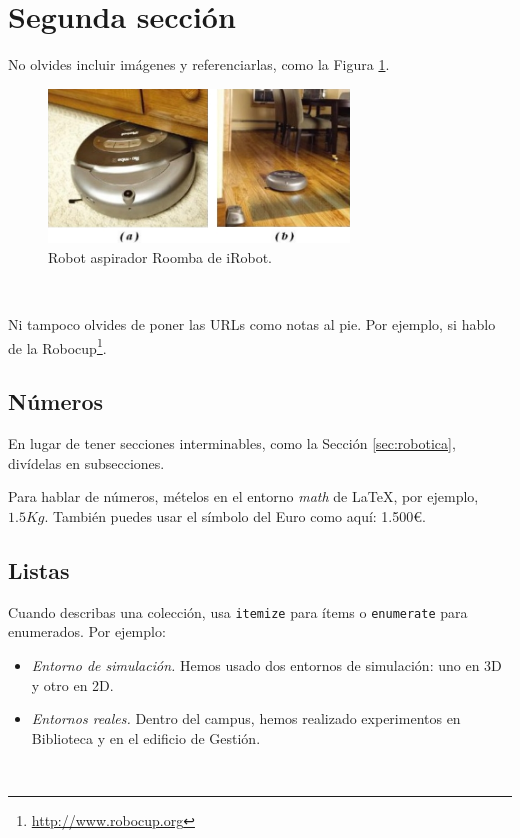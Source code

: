 \section{Segunda sección}
\label{sec:segundaseccion}

No olvides incluir imágenes y referenciarlas, como la Figura \ref{fig:roomba}.

\begin{figure} [h!]
  \begin{center}
    \includegraphics[width=8cm]{figs/roomba}
  \end{center}
  \caption{Robot aspirador Roomba de iRobot.}
  \label{fig:roomba}
\end{figure}\

Ni tampoco olvides de poner las URLs como notas al pie. Por ejemplo, si hablo de la Robocup\footnote{\url{http://www.robocup.org}}.

\subsection{Números}
\label{sec:subseccion}

En lugar de tener secciones interminables, como la Sección \ref{sec:robotica}, divídelas en subsecciones.

Para hablar de números, mételos en el entorno \textit{math} de \LaTeX, por ejemplo, $1.5Kg$. También puedes usar el símbolo del Euro como aquí: 1.500\euro.

\subsection{Listas}

Cuando describas una colección, usa \texttt{itemize} para ítems o \texttt{enumerate} para enumerados. Por ejemplo:

\begin{itemize}
 \item \textit{Entorno de simulación.} Hemos usado dos entornos de simulación: uno en 3D y otro en 2D.
 \item \textit{Entornos reales.} Dentro del campus, hemos realizado experimentos en Biblioteca y en el edificio de Gestión.
\end{itemize}\

